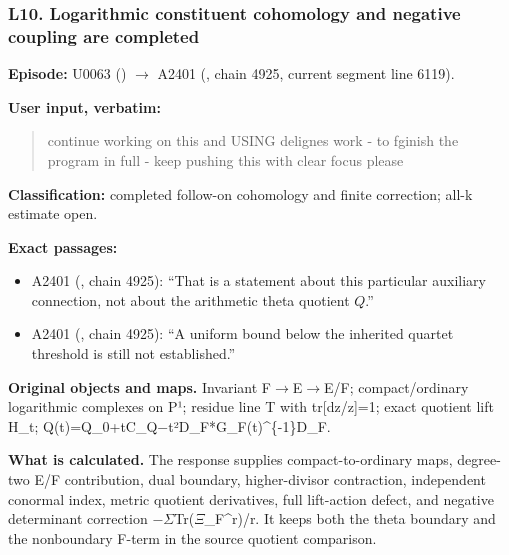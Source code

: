 \subsubsection{L10. Logarithmic constituent cohomology and negative
coupling are
completed}\label{l10.-logarithmic-constituent-cohomology-and-negative-coupling-are-completed}

\textbf{Episode:} U0063
(\protect{})
\allowbreak{}\ensuremath{→}\allowbreak{} A2401
(\protect{}, chain 4925,
current segment line 6119).

\textbf{User input, verbatim:}

\begin{quote}
continue working on this and USING delignes work - to fginish the
program in full - keep pushing this with clear focus please
\end{quote}

\textbf{Classification:} completed follow-on cohomology and finite
correction; all-k estimate open.

\textbf{Exact passages:}

\begin{itemize}
\tightlist
\item
  A2401 (\protect{}, chain
  4925): ``That is a statement about this particular auxiliary
  connection, not about the arithmetic theta quotient \(Q\).''
\item
  A2401 (\protect{}, chain
  4925): ``A uniform bound below the inherited quartet threshold is
  still not established.''
\end{itemize}

\textbf{Original objects and maps.} Invariant
F\allowbreak{}\ensuremath{→}\allowbreak{}E\allowbreak{}\ensuremath{→}\allowbreak{}E/F;
compact/ordinary logarithmic complexes on P¹; residue line T with
tr{[}dz/z{]}=1; exact quotient lift H\_t;
Q(t)=Q\_0+tC\_Q\allowbreak{}\ensuremath{−}\allowbreak{}t²D\_F*G\_F(t)\textasciicircum{}\{-1\}D\_F.

\textbf{What is calculated.} The response supplies compact-to-ordinary
maps, degree-two E/F contribution, dual boundary, higher-divisor
contraction, independent conormal index, metric quotient derivatives,
full lift-action defect, and negative determinant correction
\allowbreak{}\ensuremath{−}\allowbreak{}\allowbreak{}\ensuremath{Σ}\allowbreak{}Tr(\allowbreak{}\ensuremath{Ξ}\allowbreak{}\_F\textasciicircum{}r)/r.
It keeps both the theta boundary and the nonboundary F-term in the
source quotient comparison.

